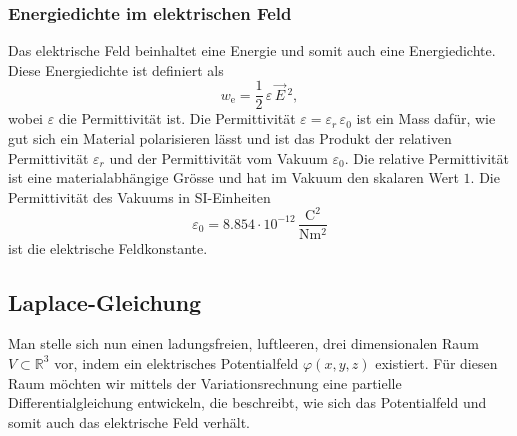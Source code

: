 \subsubsection{Energiedichte im elektrischen Feld}
Das elektrische Feld beinhaltet eine Energie und somit auch eine Energiedichte.
Diese Energiedichte ist definiert als
\begin{equation}
w_{\text{e}}
=
\frac{1}{2}\,\varepsilon\,\vec{E}\,^2,
\label{maxwell:section:definiton_energiedichte_elektrischesFeld}
\end{equation}
wobei $\varepsilon$ die Permittivität ist.
Die Permittivität
\(
\varepsilon
=
\varepsilon_r\,\varepsilon_0
\)
ist ein Mass dafür, wie gut sich ein Material polarisieren lässt und ist das Produkt der relativen Permittivität $\varepsilon_r$ und der Permittivität vom Vakuum $\varepsilon_0$.
Die relative Permittivität ist eine materialabhängige Grösse und hat im Vakuum den skalaren Wert $1$.
Die Permittivität des Vakuums in SI-Einheiten
\[
\varepsilon_0
=
8.854 \cdot 10^{-12}\,\frac{\text{C$^2$}}{\text{Nm$^2$}}
\]
ist die elektrische Feldkonstante.

\subsection{Laplace-Gleichung
	\label{maxwell:section:elektrostatik_ohne_quelle}}
Man stelle sich nun einen ladungsfreien, luftleeren, drei dimensionalen Raum $V\subset\mathbb{R}^3$
vor, indem ein elektrisches Potentialfeld $\varphi(x,y,z)$ existiert.
Für diesen Raum möchten wir mittels der Variationsrechnung eine partielle Differentialgleichung entwickeln, die beschreibt, wie sich das Potentialfeld und somit auch das elektrische Feld verhält. 

